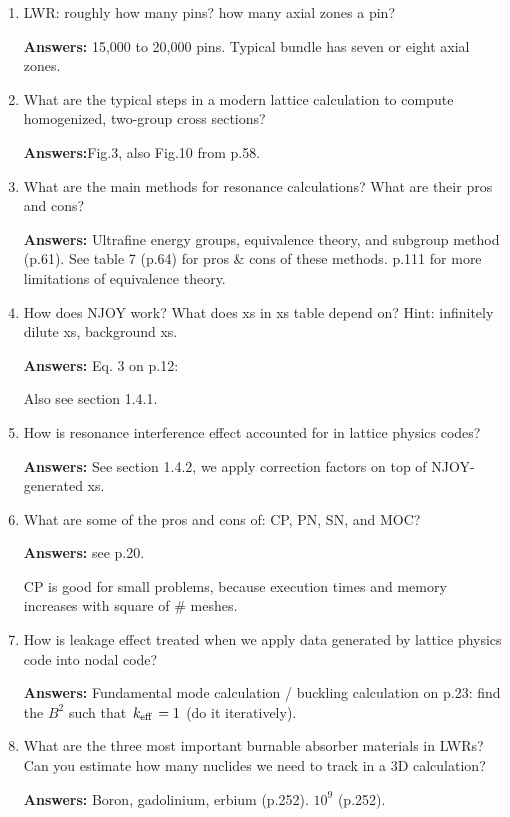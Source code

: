 \documentclass{school-22.211-notes}
\begin{document}
\begin{enumerate}
\item LWR: roughly how many pins? how many axial zones a pin?

  \textbf{Answers:} 15,000 to 20,000 pins. Typical bundle has seven or
  eight axial zones.

\item What are the typical steps in a modern lattice calculation to
  compute homogenized, two-group cross sections?

  \textbf{Answers:}Fig.3, also Fig.10 from p.58.

\item What are the main methods for resonance calculations? What are
  their pros and cons?

  \textbf{Answers:} Ultrafine energy groups, equivalence theory, and
  subgroup method (p.61). See table 7 (p.64) for pros \& cons of these
  methods. p.111 for more limitations of equivalence theory.

\item How does NJOY work? What does xs in xs table depend on?
  Hint: infinitely dilute xs, background xs.

  \textbf{Answers:} Eq. 3 on p.12:


  Also see section 1.4.1.

\item How is resonance interference effect accounted for in lattice
  physics codes?

  \textbf{Answers:} See section 1.4.2, we apply correction factors on
  top of NJOY-generated xs.

\item  What are some of the pros and cons of: CP, PN, SN, and MOC?

  \textbf{Answers:} see p.20.

  CP is good for small problems, because execution times and
  memory increases with square of \# meshes.

\item How is leakage effect treated when we apply data generated by
  lattice physics code into nodal code?

  \textbf{Answers:} Fundamental mode calculation / buckling
  calculation on p.23: find the $B^2$ such that $\left. k_{\mathrm{eff}} \right. = 1$ (do it
  iteratively).

\item What are the three most important burnable absorber materials in
  LWRs? Can you estimate how many nuclides we need to track in a 3D
  calculation?

  \textbf{Answers:} Boron, gadolinium, erbium (p.252). $10^9$ (p.252).
\end{enumerate}


\clearpage
\end{document}
